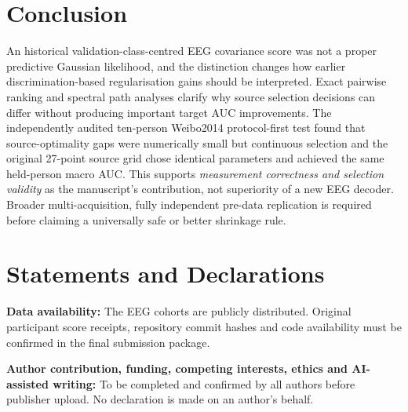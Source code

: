 \documentclass[11pt,a4paper]{article}
\begin{document}
\section{Conclusion}
An historical validation-class-centred EEG covariance score
was not a proper predictive Gaussian likelihood, and
the distinction changes how earlier discrimination-based
regularisation gains should be interpreted. Exact
pairwise ranking and spectral path analyses clarify why
source selection decisions can differ without producing
important target AUC improvements. The independently
audited ten-person Weibo2014 protocol-first test
found that source-optimality gaps were numerically
small but continuous selection and the original
27-point source grid chose identical parameters and
achieved the same held-person macro AUC.
This supports \emph{measurement correctness and
selection validity} as the manuscript's contribution,
not superiority of a new EEG decoder. Broader
multi-acquisition, fully independent pre-data
replication is required before claiming a universally
safe or better shrinkage rule.

\section*{Statements and Declarations}
\textbf{Data availability:} The EEG cohorts are publicly distributed.
Original participant score receipts, repository commit hashes and code
availability must be confirmed in the final submission package.

\textbf{Author contribution, funding, competing interests, ethics and
AI-assisted writing:} To be completed and confirmed by all authors before
publisher upload. No declaration is made on an author's behalf.



\end{document}

